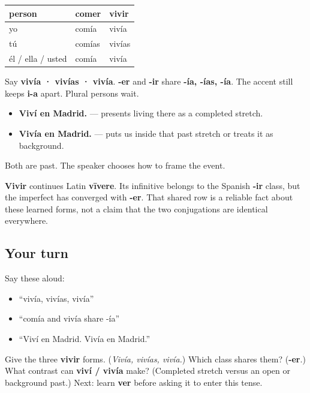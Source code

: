 \begin{grammarlens}[title={Grammar Lens: one row reused}]
\noindent
\begin{tabularx}{\linewidth}{@{}>{\raggedright\arraybackslash}X>{\raggedright\arraybackslash}X>{\raggedright\arraybackslash}X@{}}
\toprule
\textbf{person} & \textbf{comer} & \textbf{vivir} \\
\midrule
yo & comía & vivía \\
tú & comías & vivías \\
él / ella / usted & comía & vivía \\
\bottomrule
\end{tabularx}

Say \textbf{vivía · vivías · vivía}. \textbf{-er} and \textbf{-ir} share \textbf{-ía, -ías, -ía}. The accent still keeps \textbf{i-a} apart. Plural persons wait.
\end{grammarlens}

\begin{grammarlens}[title={Grammar Lens: one known contrast}]
\begin{itemize}
\raggedright
  \item \textbf{Viví en Madrid.} — presents living there as a completed stretch.
  \item \textbf{Vivía en Madrid.} — puts us inside that past stretch or treats it as background.
\end{itemize}

Both are past. The speaker chooses how to frame the event.
\end{grammarlens}

\begin{cousinweb}
\textbf{Vivir} continues Latin \textbf{vīvere}. Its infinitive belongs to the Spanish \textbf{-ir} class, but the imperfect has converged with \textbf{-er}. That shared row is a reliable fact about these learned forms, not a claim that the two conjugations are identical everywhere.
\end{cousinweb}

\subsection*{Your turn}
Say these aloud:

\begin{itemize}
\raggedright
  \item “vivía, vivías, vivía”
  \item “comía and vivía share -ía”
  \item “Viví en Madrid. Vivía en Madrid.”
\end{itemize}

\begin{tcolorbox}[breakable,colback=teal!4,colframe=teal!35!black,title={Before you move on}]
Give the three \textbf{vivir} forms. (\emph{Vivía, vivías, vivía.}) Which class shares them? (\textbf{-er}.) What contrast can \textbf{viví / vivía} make? (Completed stretch versus an open or background past.) Next: learn \textbf{ver} before asking it to enter this tense.
\end{tcolorbox}
